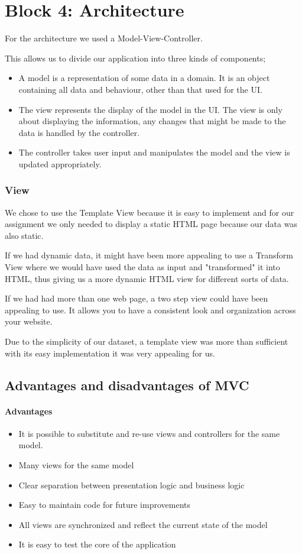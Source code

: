 \section*{Block 4: Architecture}

For the architecture we used a Model-View-Controller.

This allows us to divide our application into three kinds of components;

\begin{itemize}
\item A model is a representation of some data in a domain. It is an object containing all data and behaviour, other than that used for the UI. 
\item The view represents the display of the model in the UI. The view is only about displaying the information, any changes that might be made to the data is handled by the controller. 
\item The controller takes user input and manipulates the model and the view is updated appropriately. 
\end{itemize}

\subsubsection*{View}
We chose to use the Template View because it is easy to implement and for our assignment we only needed to display a static HTML page because our data was also static.

If we had dynamic data, it might have been more appealing to use a Transform View where we would have used the data as input and "transformed" it into HTML, thus giving us a more dynamic HTML view for different sorts of data.

If we had had more than one web page, a two step view could have been appealing to use. It allows you to have a consistent look and organization across your website. 

Due to the simplicity of our dataset, a template view was more than sufficient with its easy implementation it was very appealing for us. 

\subsection*{Advantages and disadvantages of MVC}

\paragraph{Advantages}
\begin{itemize}
\item It is possible to substitute and re-use views and controllers for the same model.
\item Many views for the same model 
\item Clear separation between presentation logic and business logic
\item Easy to maintain code for future improvements
\item All views are synchronized and reflect the current state of the model 
\item It is easy to test the core of the application
\end{itemize}

